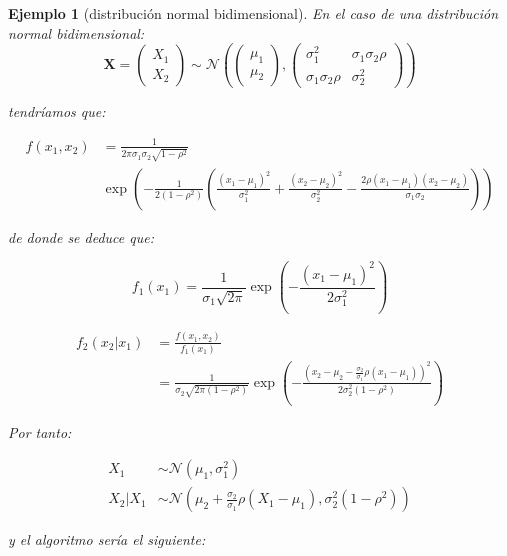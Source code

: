 \documentclass[
  10pt,
]{book}
\renewcommand{\mathbf}[1]{\symbf{#1}}
\theoremstyle{break}
\newtheorem{example}{Ejemplo}[chapter]
\theoremstyle{nonumberplain}
\begin{document}
\begin{example}[distribución normal bidimensional]

En el caso de una distribución normal bidimensional:
\[\mathbf{X} = \begin{pmatrix}
 X_1 \\
 X_2
\end{pmatrix}  
\sim \mathcal{N} \left( \begin{pmatrix}
 \mu_1 \\
 \mu_2
\end{pmatrix} , 
\begin{pmatrix}
 \sigma^2_1 &  \sigma_1 \sigma_2 \rho \\
 \sigma_1 \sigma_2 \rho &  \sigma^2_2
\end{pmatrix} \right)\]

tendríamos que:

\[\begin{aligned}
f(x_1,x_2) &= \frac{1}{2 \pi \sigma_1 \sigma_2 \sqrt{1-\rho^2}} \\
&\exp \left( -\frac{1}{2 (1-\rho^2)} \left( \frac{(x_1 - \mu_1)^2}{\sigma_1^2} + \frac{(x_2 - \mu_2)^2}{\sigma_2^2} - \frac{2 \rho (x_1 - \mu_1) (x_2 - \mu_2)}{ \sigma_1 \sigma_2} \right)
\right)
\end{aligned}\]

de donde se deduce \citep[ver e.g.][p.88]{cao2002} que:

\[f_1( x_1 ) = \frac{1}{\sigma_1\sqrt{2\pi}}
\exp\left( -\frac{(x_1 - \mu_1)^{2}}{2\sigma_1^{2}}\right)\]

\[\begin{aligned}
f_2\left( x_2|x_1\right)  &= \frac{f\left( x_1,x_2\right)  }{f_1\left( x_1\right)} \\ &= \frac{1}{\sigma_2\sqrt{2\pi (1-\rho^2)}}
\exp\left( -\frac{\left(x_2 - \mu_2 - \frac{\sigma_2}{\sigma_1}\rho( x_1 - \mu_1)\right)^{2}}{2\sigma_2^2 (1-\rho^2)}\right)
\end{aligned}\]

Por tanto:

\[\begin{aligned}
X_1 &\sim \mathcal{N}\left( \mu_1, \sigma_1^2 \right) \\
X_2 | X_1 &\sim \mathcal{N} \left( \mu_2 + \frac{\sigma_2}{\sigma_1}\rho( X_1 - \mu_1), \sigma_2^2 (1-\rho^2) \right)
\end{aligned}\]

y el algoritmo sería el siguiente:
\end{example}
\end{document}
